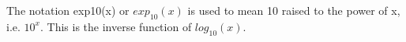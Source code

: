 The notation exp10(x) or $exp_{10}(x)$  is used to mean 10 
raised to the power of x, i.e. $10^{x}.$  This is the inverse function
of $log_{10}(x).$ 